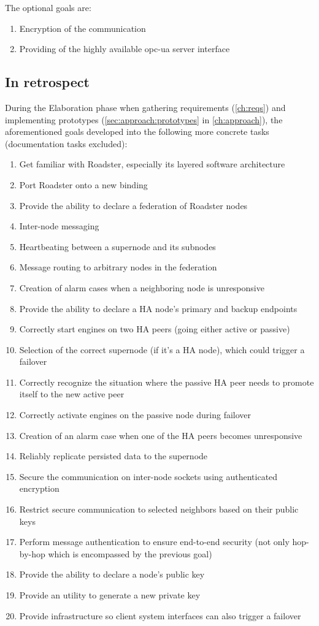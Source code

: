 The optional goals are:

\begin{enumerate}
	\item Encryption of the communication
	\item Providing of the highly available \gls{opc-ua} server interface
\end{enumerate}


\subsection{In retrospect}
During the Elaboration phase when gathering requirements (\autoref{ch:reqs})
and implementing prototypes (\autoref{sec:approach:prototypes} in \autoref{ch:approach}), the
aforementioned goals developed into the following more concrete tasks
(documentation tasks excluded):

\begin{enumerate}
	\item Get familiar with Roadster, especially its layered software architecture
	\item Port Roadster onto a new \zmq binding
	\item Provide the ability to declare a federation of Roadster nodes
	\item Inter-node messaging
	\item Heartbeating between a supernode and its subnodes
	\item Message routing to arbitrary nodes in the federation
	\item Creation of alarm cases when a neighboring node is unresponsive
	\item Provide the ability to declare a HA node's primary and backup endpoints
	\item Correctly start engines on two HA peers (going either active or passive)
	\item Selection of the correct supernode (if it's a HA node), which could trigger a failover
	\item Correctly recognize the situation where the passive HA peer needs
		to promote itself to the new active peer
	\item Correctly activate engines on the passive node during failover
	\item Creation of an alarm case when one of the HA peers becomes unresponsive
	\item Reliably replicate persisted data to the supernode
	\item Secure the communication on inter-node sockets using authenticated encryption
	\item Restrict secure communication to selected neighbors based on their public keys
	\item Perform message authentication to ensure end-to-end security (not
		only hop-by-hop which is encompassed by the previous goal)
	\item Provide the ability to declare a node's public key
	\item Provide an utility to generate a new private key
	\item Provide infrastructure so client system interfaces can also trigger a failover
\end{enumerate}


